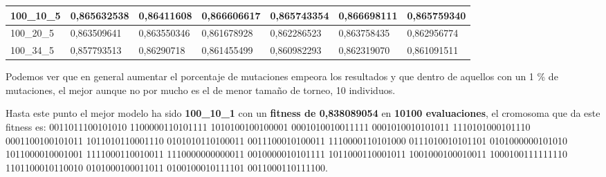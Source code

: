 \documentclass[12pt, spanish, pdftex]{UC3M_document}
\begin{document}
\begin{table}[H]
{\begin{tabular}{|l|l|l|l|l|l|l|}
			100\_10\_5                                                                           & \cellcolor[HTML]{F4E783}0,865632538                                            & \cellcolor[HTML]{63BE7B}0,86411608                                             & \cellcolor[HTML]{F9766E}0,866606617                                            & \cellcolor[HTML]{FFEB84}0,865743354                                            & \cellcolor[HTML]{F8696B}0,866698111                                            & \cellcolor[HTML]{F8696B}0,865759340                                                \\ \hline
			100\_20\_5                                                                           & \cellcolor[HTML]{FFEB84}0,863509641                                            & \cellcolor[HTML]{FED680}0,863550346                                            & \cellcolor[HTML]{63BE7B}0,861678928                                            & \cellcolor[HTML]{96CC7D}0,862286523                                            & \cellcolor[HTML]{F8696B}0,863758435                                            & \cellcolor[HTML]{FA8170}0,862956774                                                \\ \hline
			100\_34\_5                                                                           & \cellcolor[HTML]{63BE7B}0,857793513                                            & \cellcolor[HTML]{F8696B}0,86290718                                             & \cellcolor[HTML]{FFEB84}0,861455499                                            & \cellcolor[HTML]{EAE582}0,860982293                                            & \cellcolor[HTML]{FB9E76}0,862319070                                            & \cellcolor[HTML]{FB9173}0,861091511                                                \\ \hline
		\end{tabular}%
	}
\end{table}
\vspace{-.5cm}
Podemos ver que en general aumentar el porcentaje de mutaciones empeora los resultados y que dentro de aquellos con un 1 \% de mutaciones, el mejor aunque no por mucho es el de menor tamaño de torneo, 10 individuos.

Hasta este punto el mejor modelo ha sido \textbf{100\_10\_1} con un \textbf{fitness de 0,838089054} en \textbf{10100 evaluaciones}, el cromosoma que da este fitness es: 0011011100101010 1100000110101111 1010100100100001 0001010010011111 0001010010101011 1110101000101110 0001100100101011 1011010110001110 0101010110100011 0011100010100011 1110000110101000 0111010010101101 0101000000101010 1011000010001001 1111000110010011 1110000000000011 0010000010101111 1011000110001011 1001000100010011 1000100111111110 1101100010110010 0101000100011011 0100100010111101 0011000110111100. 
\end{document}
